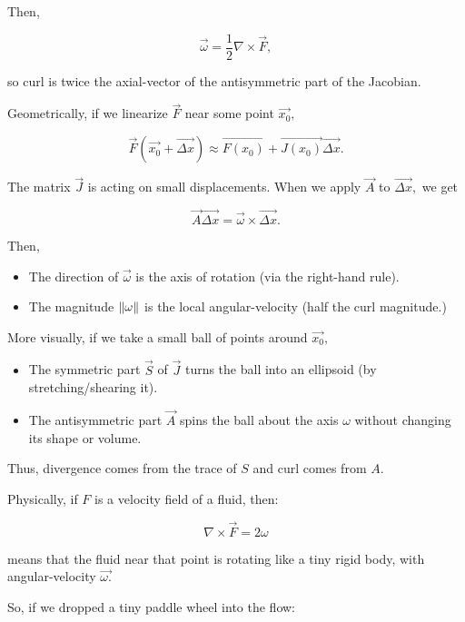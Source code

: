 \documentclass{article}
\begin{document}
Then,

\[ \vec{\omega} = \frac{1}{2} \nabla \times \vec{F}, \]

so \@{curl} is twice the \@{axial-vector} of the \@{antisymmetric} part of the \@{Jacobian}.

Geometrically, if we linearize $\vec{F}$ near some point $\vec{x_0},$

\[ \vec{F}(\vec{x_0} + \vec{\Delta x}) \approx \vec{F(x_0)} + \vec{J(x_0)} \vec{\Delta x}. \]

The matrix $\vec{J}$ is acting on small displacements. When we apply $\vec{A}$ to $\vec{\Delta x},$ we get

\[ \vec{A} \vec{\Delta x} = \vec{\omega} \times \vec{\Delta x}. \]

Then,

\begin{itemize}
\item The \@{direction} of $\vec{\omega}$ is the axis of rotation (via the right-hand rule).
\end{itemize}

\begin{itemize}
\item The \@{magnitude} $\left\lVert \omega \right\rVert$ is the local \@{angular-velocity} (half the \@{curl} \@{magnitude}.)
\end{itemize}

More visually, if we take a small \@{ball} of \@{points} around $\vec{x_0},$

\begin{itemize}
\item The symmetric part $\vec{S}$ of $\vec{J}$ turns the ball into an \@{ellipsoid} (by stretching/shearing it).
\end{itemize}

\begin{itemize}
\item The antisymmetric part $\vec{A}$ spins the ball about the axis $\omega$ without changing its shape or volume.
\end{itemize}

Thus, \@{divergence} comes from the \@{trace} of $S$ and \@{curl} comes from $A.$ 

Physically, if $F$ is a velocity field of a fluid, then:

\[ \nabla \times \vec{F} = 2 \omega \]

means that the fluid near that point is rotating like a tiny rigid body, with \@{angular-velocity} $\vec{\omega.}$

So, if we dropped a tiny paddle wheel into the flow:
\end{document}

